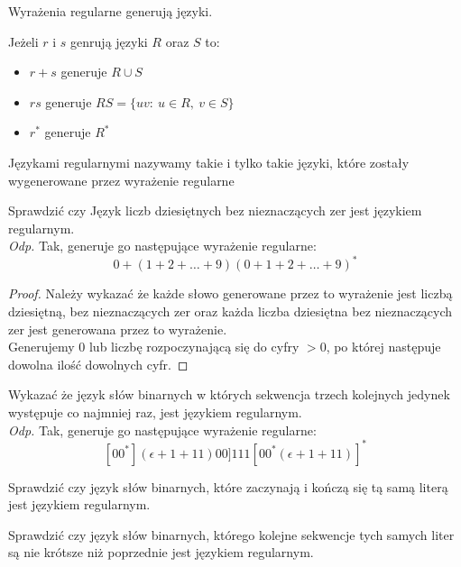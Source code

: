 	\begin{uwaga}
	Wyrażenia regularne generują języki.
	\end{uwaga}
	
	\begin{tw}
		Jeżeli $r$ i $s$ genrują języki $R$ oraz $S$ to:
		\begin{itemize}
			\item $r+s$ generuje $R\cup S$
			\item $rs$ generuje $RS = \{uv: ~ u\in R, ~ v\in S\}$
			\item $r^*$ generuje $R^*$
		\end{itemize}
	\end{tw}
	
	\begin{df}
		Językami regularnymi nazywamy takie i tylko takie języki, które zostały wygenerowane przez wyrażenie regularne
	\end{df}	
	
	\begin{przyklad}
		Sprawdzić czy Język liczb dziesiętnych bez nieznaczących zer jest językiem regularnym. \\
		\emph{Odp.} Tak, generuje go następujące wyrażenie regularne:
		$$  0 + (1+2+\dots+9)(0+1+2+\dots+9)^* $$
		\begin{proof}
			Należy wykazać że każde słowo generowane przez to wyrażenie jest liczbą dziesiętną, bez nieznaczących zer oraz każda liczba 
			dziesiętna bez nieznaczących zer jest generowana przez to wyrażenie.\\
			Generujemy $0$ lub liczbę rozpoczynającą się do cyfry $> 0$, po której następuje dowolna ilość dowolnych cyfr.
		\end{proof}
	\end{przyklad}		
	
	\begin{przyklad}
		Wykazać że język słów binarnych w których sekwencja trzech kolejnych jedynek występuje co najmniej raz,
		jest językiem regularnym. \\
		\emph{Odp.} Tak, generuje go następujące wyrażenie regularne:
		$$[00^*](\epsilon+1+11)00]111[00^*(\epsilon+1+11)]^* $$
	\end{przyklad}
	
	\begin{zad}
		Sprawdzić czy język słów binarnych, które zaczynają i kończą się tą samą literą jest językiem regularnym.
	\end{zad}
	\begin{zad}
		Sprawdzić czy język słów binarnych, którego kolejne sekwencje tych samych liter są nie krótsze niż poprzednie jest językiem regularnym.
	\end{zad}
	
